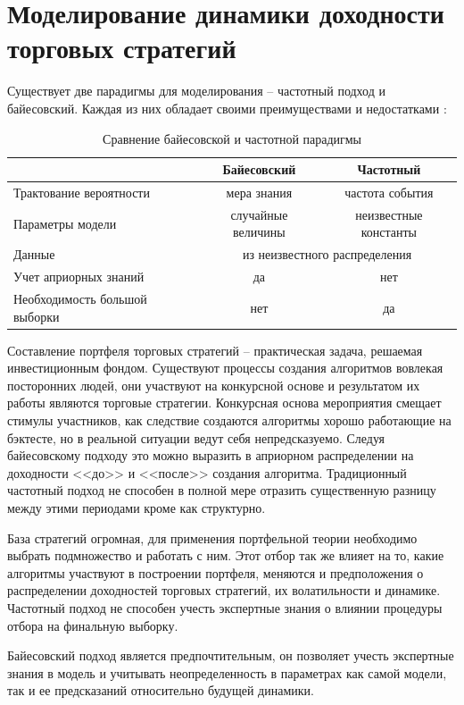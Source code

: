 \chapter{Моделирование динамики доходности торговых стратегий}
Существует две парадигмы для моделирования -- частотный подход и байесовский. Каждая из них обладает своими преимуществами и недостатками \citep{gelman2008}:
\begin{table}[h]
\centering
\caption{Сравнение байесовской и частотной парадигмы}
	\begin{tabular}{l|c|c}
	& Байесовский  & Частотный \\ \hline
	Трактование вероятности & мера знания & частота события \\ \hline
	Параметры модели & случайные величины & неизвестные константы \\ \hline
	Данные & \multicolumn{2}{c}{из неизвестного распределения}  \\ \hline
	Учет априорных знаний & да & нет \\ \hline
	Необходимость большой выборки & нет & да
 	\end{tabular}
\end{table}

Составление портфеля торговых стратегий -- практическая задача, решаемая инвестиционным фондом. Существуют процессы создания алгоритмов вовлекая посторонних людей, они участвуют на конкурсной основе и результатом их работы являются торговые стратегии. Конкурсная основа мероприятия смещает стимулы участников, как следствие создаются алгоритмы хорошо работающие на бэктесте, но в реальной ситуации ведут себя непредсказуемо. Следуя байесовскому подходу это можно выразить в априорном распределении на доходности <<до>> и <<после>> создания алгоритма. Традиционный частотный подход не способен в полной мере отразить существенную разницу между этими периодами кроме как структурно.

База стратегий огромная, для применения портфельной теории необходимо выбрать подмножество и работать с ним. Этот отбор так же влияет на то, какие алгоритмы участвуют в построении портфеля, меняются и предположения о распределении доходностей торговых стратегий, их волатильности и динамике. Частотный подход не способен учесть экспертные знания о влиянии процедуры отбора на финальную выборку.

Байесовский подход является предпочтительным, он позволяет учесть экспертные знания в модель и учитывать неопределенность в параметрах как самой модели, так и ее предсказаний относительно будущей динамики.


